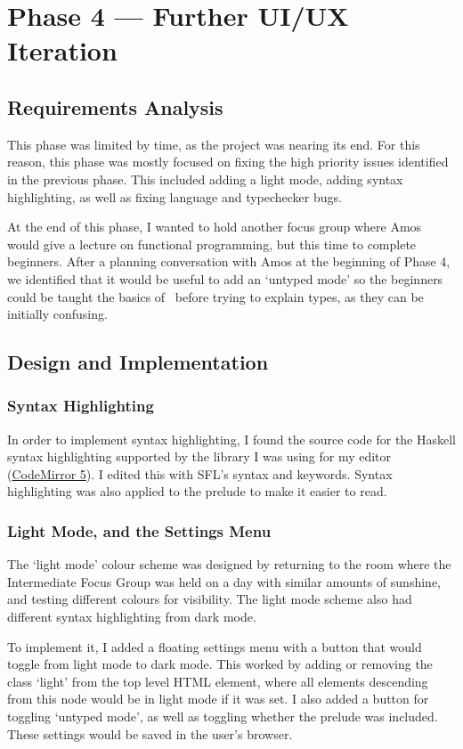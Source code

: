 \chapter{Phase 4 --- Further UI/UX Iteration}
\section{Requirements Analysis}
This phase was limited by time, as the project was nearing its end. For this reason, this phase was mostly focused on fixing the high priority issues identified in the previous phase. This included adding a light mode, adding syntax highlighting, as well as fixing language and typechecker bugs. 

At the end of this phase, I wanted to hold another focus group where Amos would give a lecture on functional programming, but this time to complete beginners. After a planning conversation with Amos at the beginning of Phase 4, we identified that it would be useful to add an `untyped mode' so the beginners could be taught the basics of \lcalc\ before trying to explain types, as they can be initially confusing. 

\section{Design and Implementation}
\subsection{Syntax Highlighting}
In order to implement syntax highlighting, I found the source code for the Haskell syntax highlighting supported by the library I was using for my editor (\href{https://codemirror.net/5/}{CodeMirror 5}). I edited this with SFL's syntax and keywords. Syntax highlighting was also applied to the prelude to make it easier to read. 

\subsection{Light Mode, and the Settings Menu}
The `light mode' colour scheme was designed by returning to the room where the Intermediate Focus Group was held on a day with similar amounts of sunshine, and testing different colours for visibility. The light mode scheme also had different syntax highlighting from dark mode. 

To implement it, I added a floating settings menu with a button that would toggle from light mode to dark mode. This worked by adding or removing the class `light' from the top level HTML element, where all elements descending from this node would be in light mode if it was set. I also added a button for toggling `untyped mode', as well as toggling whether the prelude was included. These settings would be saved in the user's browser.

